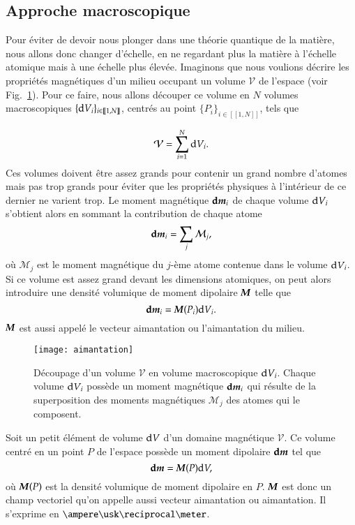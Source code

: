 \subsection{Approche macroscopique}
Pour éviter de devoir nous plonger dans une théorie quantique de la matière, nous
allons donc changer d'échelle, en ne regardant plus la matière à l'échelle atomique
mais à une échelle plus élevée. Imaginons que nous voulions décrire les propriétés magnétiques d'un milieu occupant un volume $\mathcal{V}$ de l'espace (voir Fig.~\ref{fig:aimantation}). 
Pour ce faire, nous allons découper
ce volume en $N$ volumes macroscopiques $\{\mathrm{d}V_i\}_{i \in [\![1,N]\!]}$, centrés 
au point $\{P_i\}_{i \in [\![1,N]\!]}$, 
tels que 

\begin{equation*}
\mathcal{V} = \sum_{i = 1}^N \mathrm{d}V_i. 
\end{equation*}
Ces volumes doivent être assez grands 
pour contenir un grand nombre d'atomes mais pas trop grands pour éviter 
que les propriétés physiques à l'intérieur de ce dernier ne varient trop.
Le moment magnétique $\vecd\vecm_i$ 
de chaque volume $\mathrm{d}V_i$ s'obtient alors en sommant la contribution de chaque atome
\begin{equation*}
	\vecd\vecm_i = \sum_j \mathcal{M}_j,
\end{equation*}
où $\mathcal{M}_j$ est le moment magnétique du $j$-ème atome contenue dans 
le volume $\mathrm{d}V_i$.
Si ce volume est assez grand devant les dimensions atomiques, on peut alors
introduire une densité volumique de moment dipolaire $\vecM$ telle que
\begin{equation*}
	\vecd\vecm_i = \vecM(P_i) \dV_i.
\end{equation*}
$\vecM$ est aussi appelé le vecteur aimantation ou l'aimantation du milieu.

\begin{figure}[]
	\centering
	\texttt{[image: aimantation]}
	\caption{Découpage d'un volume $\mathcal{V}$ en volume macroscopique
	$\mathrm{d}V_i$. Chaque volume $\mathrm{d}V_i$ possède un moment magnétique $\vecd\vecm_i$
	qui résulte de la superposition des moments magnétiques $\mathcal{M}_j$
	des atomes qui le composent.}%
	\label{fig:aimantation}
\end{figure}

\begin{defn}
	Soit un petit élément de volume $\mathrm{d}V$ d'un domaine magnétique $\mathcal{V}$.
	Ce volume centré en un point $P$ de l'espace 
	possède un moment dipolaire $\mathrm{\textbf{d}}\vecm$ tel que
	\begin{equation}
		\mathrm{\textbf{d}}\vecm = \vecM(P) \dV,
	\end{equation}
	où $\vecM(P)$ est la densité volumique de moment dipolaire en $P$.
	$\vecM$ est donc un champ vectoriel qu'on appelle aussi vecteur aimantation
	ou aimantation.
	Il s'exprime en $\ampere \usk \reciprocal \meter$.
\end{defn}

